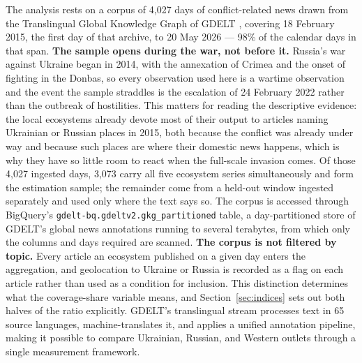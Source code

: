 \documentclass[12pt,a4paper]{article}
\begin{document}
The analysis rests on a corpus of 4,027 days of conflict-related news drawn from the Translingual Global Knowledge Graph of GDELT \citep{leetaru2013}, covering 18 February 2015, the first day of that archive, to 20 May 2026 --- 98\% of the calendar days in that span. \textbf{The sample opens during the war, not before it.} Russia's war against Ukraine began in 2014, with the annexation of Crimea and the onset of fighting in the Donbas, so every observation used here is a wartime observation and the event the sample straddles is the escalation of 24 February 2022 rather than the outbreak of hostilities. This matters for reading the descriptive evidence: the local ecosystems already devote most of their output to articles naming Ukrainian or Russian places in 2015, both because the conflict was already under way and because such places are where their domestic news happens, which is why they have so little room to react when the full-scale invasion comes. Of those 4,027 ingested days, 3,073 carry all five ecosystem series simultaneously and form the estimation sample; the remainder come from a held-out window ingested separately and used only where the text says so. The corpus is accessed through BigQuery's \texttt{gdelt-bq.gdeltv2.\allowbreak{}gkg\_partitioned} table, a day-partitioned store of GDELT's global news annotations running to several terabytes, from which only the columns and days required are scanned. \textbf{The corpus is not filtered by topic.} Every article an ecosystem published on a given day enters the aggregation, and geolocation to Ukraine or Russia is recorded as a flag on each article rather than used as a condition for inclusion. This distinction determines what the coverage-share variable means, and Section~\ref{sec:indices} sets out both halves of the ratio explicitly. GDELT's translingual stream processes text in 65 source languages, machine-translates it, and applies a unified annotation pipeline, making it possible to compare Ukrainian, Russian, and Western outlets through a single measurement framework.
\end{document}
